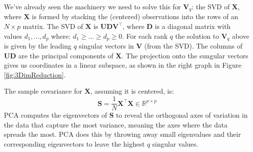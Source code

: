 \documentclass[a4paper]{article}
\begin{document}
We've already seen the machinery we need to solve this for $\mathbf{V}_q$: the SVD of $\mathbf{X}$, where $\mathbf{X}$ is formed by stacking the (centered) observations into the rows of an $N\times p$ matrix. The SVD of $\mathbf{X}$ is $\mathbf{U}\mathbf{D}\mathbf{V}^\top$, where $\mathbf{D}$ is a diagonal matrix with values $d_1, \ldots, d_p$ where: $d_1 \geq \ldots \geq d_p \geq 0$.
For each rank $q$ the solution to $\mathbf{V}_q$ above is given by the leading $q$ singular vectors in $\mathbf{V}$ (from the SVD). The columns of $\mathbf{UD}$ are the principal components of $\mathbf{X}$. The projection onto the sungular vectors gives us coordinates in a linear subspace, as shown in the right graph in Figure \ref{fig:3DimReduction}.

The sample covariance for $\mathbf{X}$, assuming it is centered, is:
$$\mathbf{S}=\frac{1}{N}\mathbf{X}^\top\mathbf{X}\in\mathbb{R}^{p\times p}$$
PCA computes the eigenvectors of $\mathbf{S}$ to reveal the orthogonal axes of variation in the data that capture the most variance, meaning the axes where the data spreads the most. PCA does this by throwing away small eigenvalues and their corresponding eigenvectors to leave the highest $q$ singular values.
\end{document}
